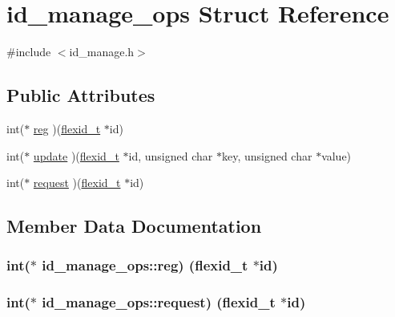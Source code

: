 \hypertarget{structid__manage__ops}{}\section{id\+\_\+manage\+\_\+ops Struct Reference}
\label{structid__manage__ops}


{\ttfamily \#include $<$id\+\_\+manage.\+h$>$}

\subsection*{Public Attributes}
\begin{DoxyCompactItemize}
\item 
int($\ast$ \hyperlink{structid__manage__ops_a1f5dd93a784407384a1cb31e34f212e2}{reg} )(\hyperlink{flex__types_8h_a4a41eecaf4b5cfed7ff1cb8d36be8c3a}{flexid\+\_\+t} $\ast$id)
\item 
int($\ast$ \hyperlink{structid__manage__ops_a4a50cc4475967070b64333cfbc95b659}{update} )(\hyperlink{flex__types_8h_a4a41eecaf4b5cfed7ff1cb8d36be8c3a}{flexid\+\_\+t} $\ast$id, unsigned char $\ast$key, unsigned char $\ast$value)
\item 
int($\ast$ \hyperlink{structid__manage__ops_abd048ab844f857df4ffe671e6075770d}{request} )(\hyperlink{flex__types_8h_a4a41eecaf4b5cfed7ff1cb8d36be8c3a}{flexid\+\_\+t} $\ast$id)
\end{DoxyCompactItemize}


\subsection{Member Data Documentation}
\subsubsection[{\texorpdfstring{reg}{reg}}]{\setlength{\rightskip}{0pt plus 5cm}int($\ast$ id\+\_\+manage\+\_\+ops\+::reg) ({\bf flexid\+\_\+t} $\ast$id)}\hypertarget{structid__manage__ops_a1f5dd93a784407384a1cb31e34f212e2}{}\label{structid__manage__ops_a1f5dd93a784407384a1cb31e34f212e2}
\subsubsection[{\texorpdfstring{request}{request}}]{\setlength{\rightskip}{0pt plus 5cm}int($\ast$ id\+\_\+manage\+\_\+ops\+::request) ({\bf flexid\+\_\+t} $\ast$id)}\hypertarget{structid__manage__ops_abd048ab844f857df4ffe671e6075770d}{}\label{structid__manage__ops_abd048ab844f857df4ffe671e6075770d}
